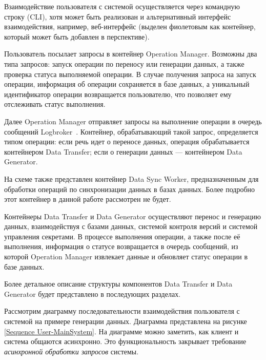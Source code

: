 Взаимодействие пользователя с системой осуществляется через командную строку (CLI), хотя может быть реализован и альтернативный интерфейс взаимодействия, например, веб-интерфейс (выделен фиолетовым как контейнер, который может быть добавлен в перспективе).

Пользователь посылает запросы в контейнер Operation Manager. Возможны два типа запросов: запуск операции по переносу или генерации данных, а также проверка статуса выполняемой операции. В случае получения запроса на запуск операции, информация об операции сохраняется в базе данных, а уникальный идентификатор операции возвращается пользователю, что позволяет ему отслеживать статус выполнения.

Далее Operation Manager отправляет запросы на выполнение операции в очередь сообщений Logbroker~\cite{logbroker}. Контейнер, обрабатывающий такой запрос, определяется типом операции: если речь идет о переносе данных, операция обрабатывается контейнером Data Transfer; если о генерации данных — контейнером Data Generator.

На схеме также представлен контейнер Data Sync Worker, предназначенным для обработки операций по синхронизации данных в базах данных. Более подробно этот контейнер в данной работе рассмотрен не будет.

Контейнеры Data Transfer и Data Generator осуществляют перенос и генерацию данных, взаимодействуя с базами данных, системой контроля версий и системой управления секретами. В процессе выполнения операции, а также после её выполнения, информация о статусе возвращается в очередь сообщений, из которой Operation Manager извлекает данные и обновляет статус операции в базе данных.

Более детальное описание структуры компонентов Data Transfer и Data Generator будет представлено в последующих разделах.

Рассмотрим диаграмму последовательности взаимодействия пользователя с системой на примере генерации данных. Диаграмма представлена на рисунке \ref{Sequence User-MainSystem}. На диаграмме можно заметить, как клиент и система общаются асинхронно. Это функциональность закрывает требование \textit{асинхронной обработки запросов} системы.

